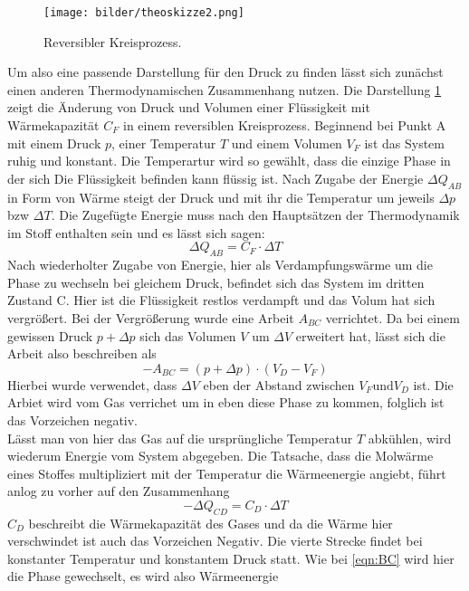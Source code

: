 \begin{figure}
    \centering
    \texttt{[image: bilder/theoskizze2.png]}
    \caption{Reversibler Kreisprozess. \cite{skript}} 
    \label{fig:figtheo2}
\end{figure}
Um also eine passende Darstellung für den Druck zu finden lässt sich zunächst einen anderen Thermodynamischen Zusammenhang nutzen. 
Die Darstellung \ref{fig:figtheo2} zeigt die Änderung von Druck und Volumen einer Flüssigkeit mit Wärmekapazität $C_F$ in einem reversiblen Kreisprozess.
Beginnend bei Punkt A mit einem Druck $p$, einer Temperatur $T$ und einem Volumen $V_F$ ist das System ruhig und konstant. Die Temperartur wird so
gewählt, dass die einzige Phase in der sich Die Flüssigkeit befinden kann flüssig ist.
Nach Zugabe der Energie $\Delta Q_{AB}$ in Form von Wärme steigt der Druck und mit ihr die Temperatur um jeweils $\Delta p$ bzw $\Delta T$.
Die Zugefügte Energie muss nach den Hauptsätzen der Thermodynamik im Stoff enthalten sein und es lässt sich sagen:
\begin{equation}
    \Delta Q_{AB} = C_F \cdot \Delta T
\end{equation}
Nach wiederholter Zugabe von Energie, hier als Verdampfungswärme um die Phase zu wechseln bei gleichem Druck, befindet sich das System im dritten Zustand
C. Hier ist die Flüssigkeit restlos verdampft und das Volum hat sich vergrößert. Bei der Vergrößerung wurde eine Arbeit $A_{BC}$ verrichtet. 
Da bei einem gewissen Druck $p +\Delta p$ sich das Volumen $V$  um $\Delta V$ erweitert hat, lässt sich die Arbeit also beschreiben als
\begin{equation}
\label{eqn:BC}
    -A_{BC} = (p+ \Delta p) \cdot (V_D-V_F)
\end{equation}
Hierbei wurde verwendet, dass $\Delta V$ eben der Abstand zwischen $V_F \text{und} V_D$ ist. Die Arbiet wird vom Gas verrichet um in eben diese Phase
zu kommen, folglich ist das Vorzeichen negativ. \\
Lässt man von hier das Gas auf die ursprüngliche Temperatur $T$ abkühlen, wird wiederum Energie vom System abgegeben.
Die Tatsache, dass die Molwärme eines Stoffes multipliziert mit der Temperatur die Wärmeenergie angiebt, führt anlog zu vorher auf den Zusammenhang
\begin{equation}
    -\Delta Q_{CD} = C_D \cdot \Delta T
\end{equation}
$C_D$ beschreibt die Wärmekapazität des Gases und da die Wärme hier verschwindet ist auch das Vorzeichen Negativ.
Die vierte Strecke findet bei konstanter Temperatur und konstantem Druck statt. Wie bei \eqref{eqn:BC} wird hier die Phase gewechselt, es wird also Wärmeenergie 
